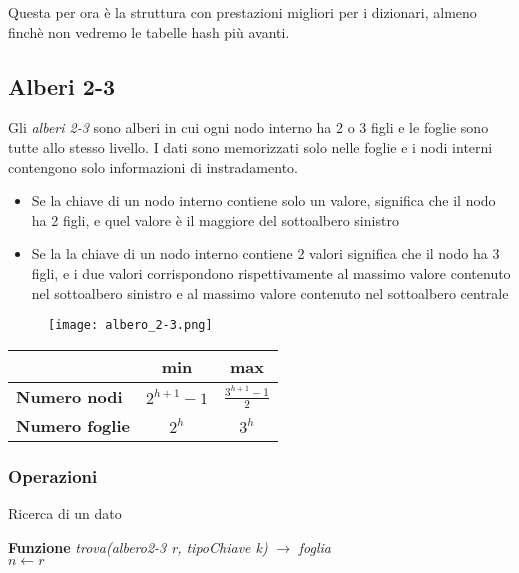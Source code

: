 \noindent Questa per ora è la struttura con prestazioni migliori per i dizionari, almeno 
finchè non vedremo le tabelle hash più avanti.

\subsection{Alberi 2-3}
Gli \emph{alberi 2-3} sono alberi in cui ogni nodo interno ha 2 o 3 figli
e le foglie sono tutte allo stesso livello. I dati sono memorizzati solo nelle foglie
e i nodi interni contengono solo informazioni di instradamento.
\begin{itemize}
    \item Se la chiave di un nodo interno contiene solo un valore, significa che il nodo ha 2 figli,
        e quel valore è il maggiore del sottoalbero sinistro
    \item Se la la chiave di un nodo interno contiene 2 valori significa che il nodo ha 3 figli, e i due
    valori corrispondono rispettivamente al massimo valore contenuto nel sottoalbero sinistro e al massimo
    valore contenuto nel sottoalbero centrale
\end{itemize} 
    
\begin{figure}[h]
    \texttt{[image: albero\_2-3.png]}
\end{figure}

\begin{tabular}{|l|c|c|}
    \hline
    \space & \textbf{min} & \textbf{max}\\
    \hline
    \textbf{Numero nodi} & $2^{h+1}-1$ & $\frac{3^{h+1}-1}{2}$\\
    \hline
    \textbf{Numero foglie} & $2^{h}$ & $3^{h}$\\
    \hline
\end{tabular}
\subsubsection{Operazioni}

\begin{algorithm}
    \caption{Ricerca di un dato}
    \Indm\textbf{Funzione} \emph{trova(albero2-3 r, tipoChiave k)} $\rightarrow$ \emph{foglia}\\
    \Indp$n \leftarrow r$\\
\end{algorithm}


